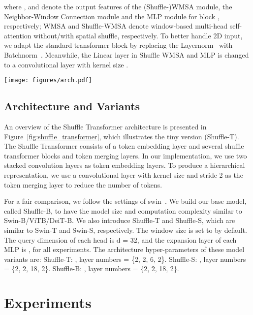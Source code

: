 \documentclass{article}
\begin{document}
where ,  and  denote the output features of the (Shuffle-)WMSA module, the Neighbor-Window Connection module and the MLP module for block , respectively; WMSA and Shuffle-WMSA denote window-based multi-head self-attention without/with spatial shuffle, respectively. To better handle 2D input, we adapt the standard transformer block by replacing the Layernorm~\cite{ba2016layer} with Batchnorm~\cite{ioffe2015batch}. Meanwhile, the Linear layer in Shuffle WMSA and MLP is changed to a convolutional layer with kernel size .

\begin{figure*}[!t]
    \centering
    \texttt{[image: figures/arch.pdf]}
    \caption{The architecture of a Shuffle Transformer (Shuffle-T).}
    \label{fig:shuffle_transformer}
    \vspace{0mm}
\end{figure*}

\subsection{Architecture and Variants}
An overview of the Shuffle Transformer architecture is presented in Figure~\ref{fig:shuffle_transformer}, which illustrates the tiny version (Shuffle-T). The Shuffle Transformer consists of a token embedding layer and several shuffle transformer blocks and token merging layers. In our implementation, we use two stacked convolution layers as token embedding layers. To produce a hierarchical representation, we use a convolutional layer with kernel size  and stride 2 as the token merging layer to reduce the number of tokens.

For a fair comparison, we follow the settings of swin~\cite{liu2021Swin}. We build our base model, called Shuffle-B, to have the model size and computation complexity similar to Swin-B/ViTB/DeiT-B. We also introduce Shuffle-T and Shuffle-S,
which are similar to Swin-T and Swin-S, respectively. The
window size is set to  by default. The query dimension of each head is d = 32, and the expansion layer of
each MLP is , for all experiments. The architecture
hyper-parameters of these model variants are: Shuffle-T: , layer numbers = \{2, 2, 6, 2\}. Shuffle-S: , layer numbers = \{2, 2, 18, 2\}. Shuffle-B: , layer numbers = \{2, 2, 18, 2\}. 

\section{Experiments}
\end{document}
